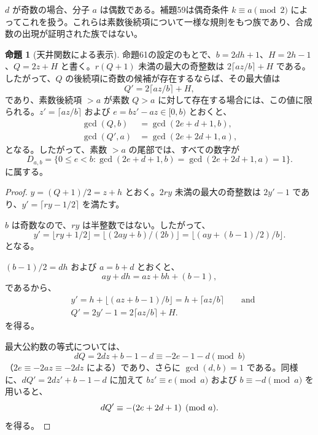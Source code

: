 \documentclass[11pt,reqno]{amsart}
\theoremstyle{definition}
\newtheorem{proposition}[theorem]{命題}
\theoremstyle{definition}
\theoremstyle{remark}
\begin{document}
\(d\) が奇数の場合、分子 \(a\) は偶数である。補題59は偶奇条件 \(k\equiv a\pmod2\) によってこれを扱う。これらは素数後続項について一様な規則をもつ族であり、合成数の出現が証明された族ではない。

\begin{samepage}
\begin{proposition}[天井関数による表示]\leavevmode\label{thm:62}
命題61の設定のもとで、\(b=2dh+1\)、\(H=2h-1\)、\(Q=2z+H\) と書く。\(r(Q+1)\) 未満の最大の奇整数は \(2\lceil az/b\rceil+H\) である。したがって、\(Q\) の後続項に奇数の候補が存在するならば、その最大値は
\[
Q'=2\lceil az/b\rceil+H,
\]
であり、素数後続項 \(>a\) が素数 \(Q>a\) に対して存在する場合には、この値に限られる。\(z'=\lceil az/b\rceil\) および \(e=bz'-az\in[0,b)\) とおくと、
\[
\begin{aligned}
\gcd(Q,b)&=\gcd(2e+d+1,b),\\
\gcd(Q',a)&=\gcd(2e+2d+1,a),
\end{aligned}
\]
となる。したがって、素数 \(>a\) の尾部では、すべての数字が
\[
D_{a,b}=\{0\le e<b:\gcd(2e+d+1,b)=\gcd(2e+2d+1,a)=1\}.
\]
に属する。
\label{thm-end:62}
\end{proposition}
\end{samepage}

\begin{proof}\leavevmode\label{proof:62}
\(y=(Q+1)/2=z+h\) とおく。\(2ry\) 未満の最大の奇整数は \(2y'-1\) であり、\(y'=\lceil ry-1/2\rceil\) を満たす。

\(b\) は奇数なので、\(ry\) は半整数ではない。したがって、
\[
y'=\lfloor ry+1/2\rfloor
=\lfloor(2ay+b)/(2b)\rfloor=\lfloor(ay+(b-1)/2)/b\rfloor.
\]
となる。

\((b-1)/2=dh\) および \(a=b+d\) とおくと、
\[
ay+dh=az+bh+(b-1),
\]
であるから、
\[
\begin{aligned}
&y'=h+\lfloor(az+b-1)/b\rfloor=h+\lceil az/b\rceil\qquad\text{and}\\
&Q'=2y'-1=2\lceil az/b\rceil+H.
\end{aligned}
\]
を得る。

最大公約数の等式については、
\[
dQ=2dz+b-1-d\equiv-2e-1-d\pmod b
\]
（\(2e\equiv-2az\equiv-2dz\) による）であり、さらに \(\gcd(d,b)=1\) である。同様に、\(dQ'=2dz'+b-1-d\) に加えて \(bz'\equiv e\pmod a\) および \(b\equiv-d\pmod a\) を用いると、
\[
dQ'\equiv-(2e+2d+1)\pmod a.\qedhere
\]
を得る。
\end{proof}
\end{document}
